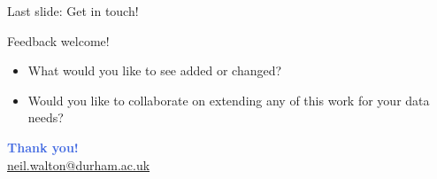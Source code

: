 \documentclass{beamer}
\let\oldtextbf\textbf
\renewcommand{\textbf}[1]{\textcolor{RoyalBlue}{\oldtextbf{#1}}}
\begin{document}
\begin{frame}{Last slide: Get in touch!}
    
    {Feedback welcome!}
    \begin{itemize}
        \item What would you like to see added or changed?
        \item Would you like to collaborate on extending any of this work for your data needs?
    \end{itemize}

    \vspace{0.75em}
    \begin{center}
        \Large \textbf{Thank you!}\\[0.4em]
        \normalsize \href{mailto:neil.walton@durham.ac.uk}{neil.walton@durham.ac.uk}
    \end{center}
\end{frame}

\end{document}
